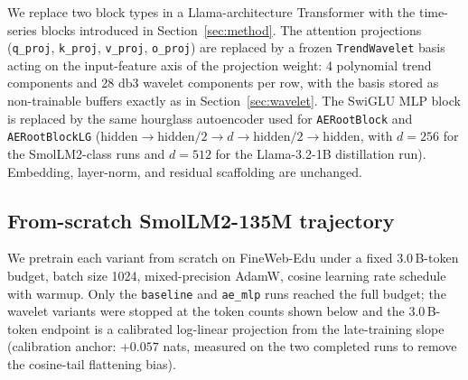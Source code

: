 \documentclass{article}
\begin{document}
We replace two block types in a Llama-architecture Transformer with the time-series blocks introduced in Section~\ref{sec:method}. The attention projections (\texttt{q\_proj}, \texttt{k\_proj}, \texttt{v\_proj}, \texttt{o\_proj}) are replaced by a frozen \texttt{TrendWavelet} basis acting on the input-feature axis of the projection weight: 4 polynomial trend components and 28 db3 wavelet components per row, with the basis stored as non-trainable buffers exactly as in Section~\ref{sec:wavelet}. The SwiGLU MLP block is replaced by the same hourglass autoencoder used for \texttt{AERootBlock} and \texttt{AERootBlockLG} ($\mathrm{hidden} \to \mathrm{hidden}/2 \to d \to \mathrm{hidden}/2 \to \mathrm{hidden}$, with $d=256$ for the SmolLM2-class runs and $d=512$ for the Llama-3.2-1B distillation run). Embedding, layer-norm, and residual scaffolding are unchanged.

\begin{table}[h]
  \caption{Parameter counts for the SmolLM2-135M-class port. The MLP block accounts for 59\% of the baseline parameter count and is the primary compression target. Total compression of the variants is roughly proportional to MLP-block compression.}
  \label{tab:llm_params}
  \centering
\end{table}

\subsection{From-scratch SmolLM2-135M trajectory}

We pretrain each variant from scratch on FineWeb-Edu under a fixed 3.0\,B-token budget, batch size 1024, mixed-precision AdamW, cosine learning rate schedule with warmup. Only the \texttt{baseline} and \texttt{ae\_mlp} runs reached the full budget; the wavelet variants were stopped at the token counts shown below and the 3.0\,B-token endpoint is a calibrated log-linear projection from the late-training slope (calibration anchor: $+0.057$ nats, measured on the two completed runs to remove the cosine-tail flattening bias).
\end{document}
